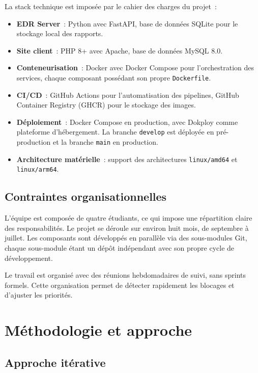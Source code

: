 La stack technique est imposée par le cahier des charges du projet~:

\begin{itemize}
  \item \textbf{EDR Server}~: Python avec FastAPI, base de données
    SQLite pour le stockage local des rapports.
  \item \textbf{Site client}~: PHP 8+ avec Apache, base de données MySQL
    8.0.
  \item \textbf{Conteneurisation}~: Docker avec Docker Compose pour
    l'orchestration des services, chaque composant possédant son propre
    \texttt{Dockerfile}.
  \item \textbf{CI/CD}~: GitHub Actions pour l'automatisation des
    pipelines, GitHub Container Registry (GHCR) pour le stockage des
    images.
  \item \textbf{Déploiement}~: Docker Compose en production, avec
    Dokploy comme plateforme d'hébergement. La branche \texttt{develop}
    est déployée en pré-production et la branche \texttt{main} en
    production.
  \item \textbf{Architecture matérielle}~: support des architectures
    \texttt{linux/amd64} et \texttt{linux/arm64}.
\end{itemize}

\subsection{Contraintes organisationnelles}

L'équipe est composée de quatre étudiants, ce qui impose une répartition
claire des responsabilités. Le projet se déroule sur environ huit mois,
de septembre à juillet. Les composants sont développés en parallèle via
des sous-modules Git, chaque sous-module étant un dépôt indépendant avec
son propre cycle de développement.

Le travail est organisé avec des réunions hebdomadaires de suivi, sans
sprints formels. Cette organisation permet de détecter rapidement les
blocages et d'ajuster les priorités.

\section{Méthodologie et approche}

\subsection{Approche itérative}


